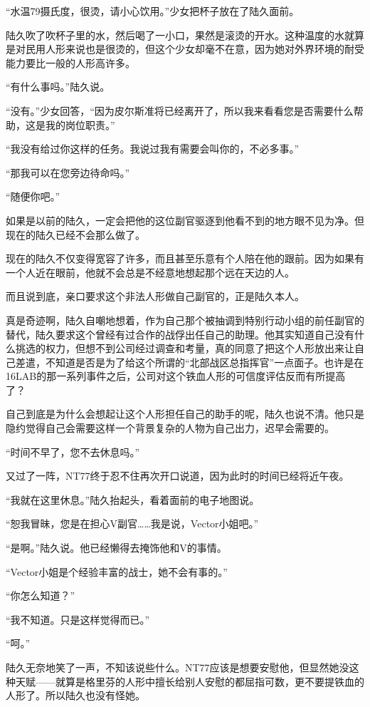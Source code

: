 “水温79摄氏度，很烫，请小心饮用。”少女把杯子放在了陆久面前。

陆久吹了吹杯子里的水，然后喝了一小口，果然是滚烫的开水。这种温度的水就算是对民用人形来说也是很烫的，但这个少女却毫不在意，因为她对外界环境的耐受能力要比一般的人形高许多。

“有什么事吗。”陆久说。

“没有。”少女回答，“因为皮尔斯准将已经离开了，所以我来看看您是否需要什么帮助，这是我的岗位职责。”

“我没有给过你这样的任务。我说过我有需要会叫你的，不必多事。”

“那我可以在您旁边待命吗。”

“随便你吧。”

如果是以前的陆久，一定会把他的这位副官驱逐到他看不到的地方眼不见为净。但现在的陆久已经不会那么做了。

现在的陆久不仅变得宽容了许多，而且甚至乐意有个人陪在他的跟前。因为如果有一个人近在眼前，他就不会总是不经意地想起那个远在天边的人。

而且说到底，亲口要求这个非法人形做自己副官的，正是陆久本人。

真是奇迹啊，陆久自嘲地想着，作为自己那个被抽调到特别行动小组的前任副官的替代，陆久要求这个曾经有过合作的战俘出任自己的助理。他其实知道自己没有什么挑选的权力，但想不到公司经过调查和考量，真的同意了把这个人形放出来让自己差遣，不知道是否是为了给这个所谓的“北部战区总指挥官”一点面子。也许是在16LAB的那一系列事件之后，公司对这个铁血人形的可信度评估反而有所提高了？

自己到底是为什么会想起让这个人形担任自己的助手的呢，陆久也说不清。他只是隐约觉得自己会需要这样一个背景复杂的人物为自己出力，迟早会需要的。

“时间不早了，您不去休息吗。”

又过了一阵，NT77终于忍不住再次开口说道，因为此时的时间已经将近午夜。

“我就在这里休息。”陆久抬起头，看着面前的电子地图说。

“恕我冒昧，您是在担心V副官……我是说，Vector小姐吧。”

“是啊。”陆久说。他已经懒得去掩饰他和V的事情。

“Vector小姐是个经验丰富的战士，她不会有事的。”

“你怎么知道？”

“我不知道。只是这样觉得而已。”

“呵。”

陆久无奈地笑了一声，不知该说些什么。NT77应该是想要安慰他，但显然她没这种天赋——就算是格里芬的人形中擅长给别人安慰的都屈指可数，更不要提铁血的人形了。所以陆久也没有怪她。

